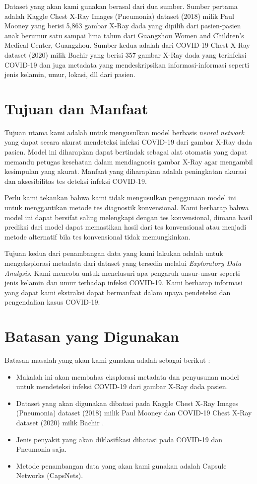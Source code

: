 \documentclass{article}
\begin{document}
   Dataset yang akan kami gunakan berasal dari dua sumber. Sumber pertama adalah  Kaggle Chest X-Ray Images (Pneumonia) dataset (2018) milik Paul Mooney \cite{mooney} yang berisi 5,863 gambar X-Ray dada yang dipilih dari pasien-pasien anak berumur satu sampai lima tahun dari Guangzhou Women and Children’s Medical Center, Guangzhou. Sumber kedua adalah dari COVID-19 Chest X-Ray dataset (2020) milik Bachir \cite{bachir_2} yang berisi 357 gambar X-Ray dada yang terinfeksi COVID-19 dan juga metadata yang mendeskripsikan informasi-informasi seperti jenis kelamin, umur, lokasi, dll dari pasien. 
   
   \section{Tujuan dan Manfaat}
   Tujuan utama kami adalah untuk mengusulkan model berbasis \textit{neural network} yang dapat secara akurat mendeteksi infeksi COVID-19 dari gambar X-Ray dada pasien. Model ini diharapkan dapat bertindak sebagai alat otomatis yang dapat memandu petugas kesehatan dalam mendiagnosis gambar X-Ray agar mengambil kesimpulan yang akurat. Manfaat yang diharapkan adalah peningkatan akurasi dan aksesibilitas tes deteksi infeksi COVID-19. 
   \par
   Perlu kami tekankan bahwa kami tidak mengusulkan penggunaan model ini untuk menggantikan metode tes diagnostik konvensional. Kami berharap bahwa model ini dapat bersifat saling melengkapi dengan tes konvensional, dimana hasil prediksi dari model dapat memastikan hasil dari tes konvensional atau menjadi metode alternatif bila tes konvensional tidak memungkinkan. 
   \par
   Tujuan kedua dari penambangan data yang kami lakukan adalah untuk mengeksplorasi metadata dari dataset yang tersedia melalui \textit{Exploratory Data Analysis}. Kami mencoba untuk menelusuri apa pengaruh unsur-unsur seperti jenis kelamin dan umur terhadap infeksi COVID-19. Kami berharap informasi yang dapat kami ekstraksi dapat bermanfaat dalam upaya pendeteksi dan pengendalian kasus COVID-19.
   
   \section{Batasan yang Digunakan}
   Batasan masalah yang akan kami gunakan adalah sebagai berikut :
   
   \begin{itemize}
   	\item Makalah ini akan membahas eksplorasi metadata dan penyusunan model untuk mendeteksi infeksi COVID-19 dari gambar X-Ray dada pasien\cite{cohen}.
   	\item Dataset yang akan digunakan dibatasi pada Kaggle Chest X-Ray Images (Pneumonia) dataset (2018) milik Paul Mooney \cite{mooney} dan COVID-19 Chest X-Ray dataset (2020) milik Bachir \cite{bachir_2}.
   	\item Jenis penyakit yang akan diklasifikasi dibatasi pada COVID-19 dan Pneumonia saja.
   	\item Metode penambangan data yang akan kami gunakan adalah Capsule Networks (CapsNets).
   \end{itemize}
\end{document}
